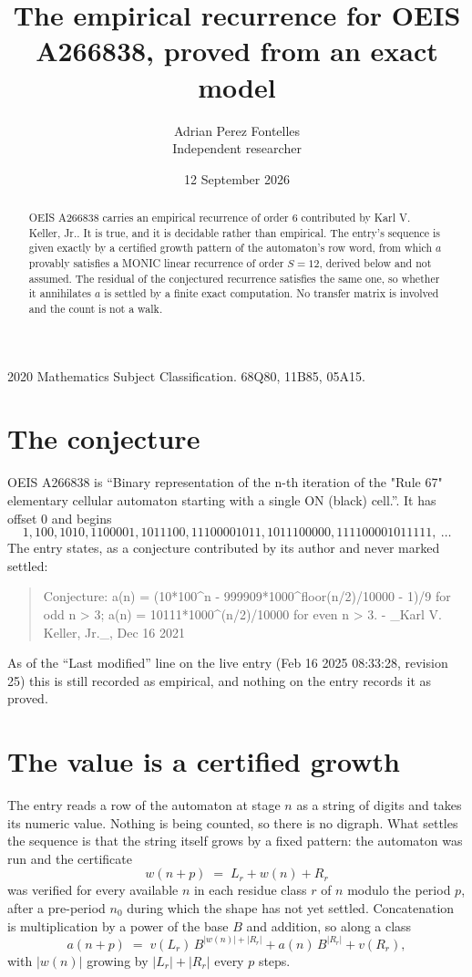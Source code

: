 \documentclass[11pt,a4paper]{article}
\title{The empirical recurrence for OEIS A266838, proved from an exact model}
\author{Adrian Perez Fontelles\\ \small Independent researcher}
\date{12 September 2026}
\theoremstyle{plain}
\theoremstyle{definition}
\begin{document}
\maketitle

\begin{abstract}
OEIS A266838 carries an empirical recurrence of order $6$ contributed by Karl V. Keller, Jr.. It is true, and it is
decidable rather than empirical. The entry's sequence is given exactly by a certified growth pattern of the automaton's row word, from
which $a$ provably satisfies a MONIC linear recurrence of order $S=12$, derived below and not
assumed. The residual of the conjectured recurrence satisfies the same one, so whether it
annihilates $a$ is settled by a finite exact computation. No transfer matrix is involved and
the count is not a walk.
\end{abstract}

\noindent\small 2020 Mathematics Subject Classification. 68Q80, 11B85, 05A15.\normalsize

\section{The conjecture}

OEIS A266838 is ``Binary representation of the n-th iteration of the "Rule 67" elementary cellular automaton starting with a single ON (black) cell.''. It has offset $0$ and begins
\[
1, 100, 1010, 1100001, 1011100, 11100001011, 1011100000, 111100001011111,\ \dots
\]
The entry states, as a conjecture contributed by its author and never marked settled:
\begin{quote}
Conjecture: a(n) = (10*100\^{}n - 999909*1000\^{}floor(n/2)/10000 - 1)/9 for odd n > 3; a(n) = 10111*1000\^{}(n/2)/10000 for even n > 3. - \_Karl V. Keller, Jr.\_, Dec 16 2021
\end{quote}
As of the ``Last modified'' line on the live entry (Feb 16 2025 08:33:28, revision 25)
this is still recorded as empirical, and nothing on the entry records it as proved.

\section{The value is a certified growth}

The entry reads a row of the automaton at stage $n$ as a string of digits and takes its
numeric value. Nothing is being counted, so there is no digraph. What settles the sequence is
that the string itself grows by a fixed pattern: the automaton was run and the certificate
\[
w(n+p)\;=\;L_r + w(n) + R_r
\]
was verified for every available $n$ in each residue class $r$ of $n$ modulo the period $p$,
after a pre-period $n_0$ during which the shape has not yet settled. Concatenation is
multiplication by a power of the base $B$ and addition, so along a class
\[
a(n+p)\;=\;v(L_r)\,B^{|w(n)|+|R_r|} + a(n)\,B^{|R_r|} + v(R_r),
\]
with $|w(n)|$ growing by $|L_r|+|R_r|$ every $p$ steps.
\end{document}
